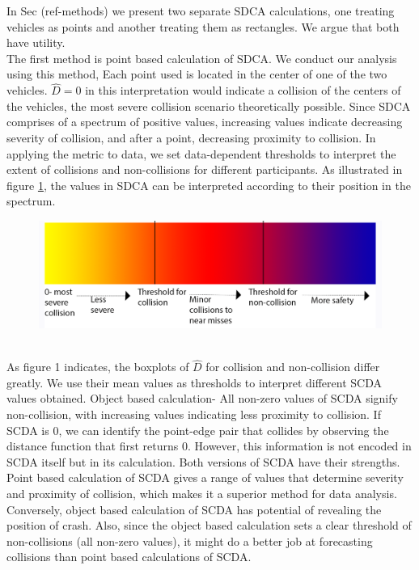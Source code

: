 \documentclass{article}
\begin{document}
In Sec (ref-methods) we present two separate SDCA calculations, one treating vehicles as points and another treating them as rectangles. We argue that both have utility.\\
The first method is point based calculation of SDCA. We conduct our analysis using this method, Each point used is located in the center of one of the two vehicles. $\hat{D} = 0$ in this interpretation would indicate a collision of the centers of the vehicles, the most severe collision scenario theoretically possible. Since SDCA comprises of a spectrum of positive values, increasing values indicate decreasing severity of collision, and after a point, decreasing proximity to collision. In applying the metric to data, we set data-dependent thresholds to interpret the extent of collisions and non-collisions for different participants. As illustrated in figure \ref{figure 4}, the values in SDCA can be interpreted according to their position in the spectrum.
\begin{figure}[h!]
\includegraphics[width = 12cm, height = 3 cm]{discussion_1.png}
\label{figure 4}
\end{figure}\\
As figure 1 indicates, the boxplots of $\hat{D}$ for collision and non-collision differ greatly. We use their mean values as thresholds to interpret different SCDA values obtained.
Object based calculation- All non-zero values of SCDA signify non-collision, with increasing values indicating less proximity to collision. If SCDA is 0, we can identify the point-edge pair that collides by observing the distance function that first returns 0. However, this information is not encoded in SCDA itself but in its calculation.
Both versions of SCDA have their strengths. Point based calculation of SCDA gives a range of values that determine severity and proximity of collision, which makes it a superior method for data analysis. Conversely, object based calculation of SCDA has potential of revealing the position of crash. Also, since the object based calculation sets a clear threshold of non-collisions (all non-zero values), it might do a better job at forecasting collisions than point based calculations of SCDA.\\
\end{document}
